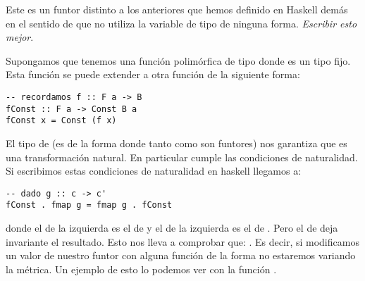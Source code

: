 Este es un funtor distinto a los anteriores que hemos
definido en Haskell demás en el sentido de que no utiliza
la variable de tipo de ninguna forma. \textit{Escribir esto mejor}.


Supongamos que tenemos una función polimórfica de tipo
 donde  es un tipo fijo. Esta función
se puede extender a otra función
 de la siguiente forma:
\begin{verbatim}
-- recordamos f :: F a -> B
fConst :: F a -> Const B a
fConst x = Const (f x)
\end{verbatim}
El tipo de  (es de la forma  donde tanto
 como  son funtores) nos garantiza que es una transformación
natural. En particular cumple las condiciones de naturalidad. Si
escribimos estas condiciones de naturalidad en haskell llegamos a:

\begin{verbatim}
-- dado g :: c -> c'
fConst . fmap g = fmap g . fConst
\end{verbatim}

donde el  de la izquierda es el de  y el de
la izquierda es el de . Pero el de 
deja invariante el resultado. Esto nos lleva a comprobar que:
. Es decir, si modificamos un valor de
nuestro funtor con alguna función de la forma  no
estaremos variando la métrica. Un ejemplo de esto lo podemos
ver con la función .
